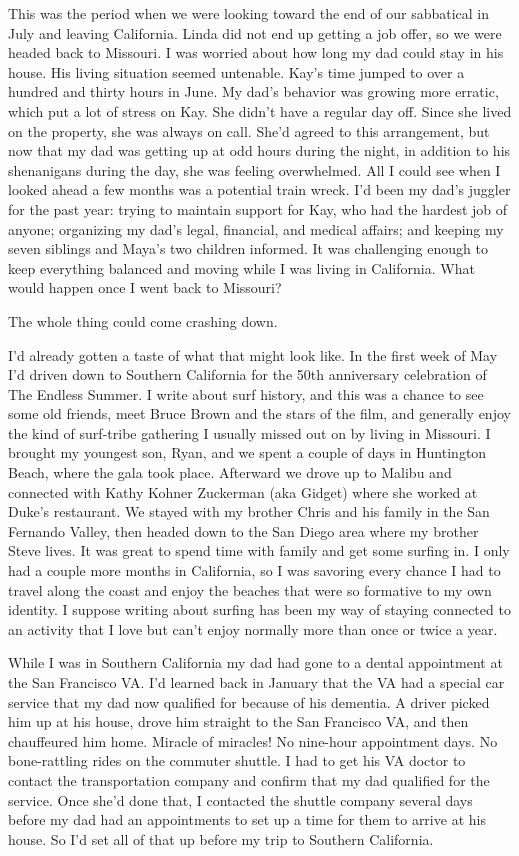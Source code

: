\documentclass[12pt]{book}
\begin{document}
This was the period when we were looking toward the end of our sabbatical in July and leaving California. Linda did not end up getting a job offer, so we were headed back to Missouri. I was worried about how long my dad could stay in his house. His living situation seemed untenable. Kay's time jumped to over a hundred and thirty hours in June. My dad's behavior was growing more erratic, which put a lot of stress on Kay. She didn't have a regular day off. Since she lived on the property, she was always on call. She'd agreed to this arrangement, but now that my dad was getting up at odd hours during the night, in addition to his shenanigans during the day, she was feeling overwhelmed. All I could see when I looked ahead a few months was a potential train wreck. I'd been my dad's juggler for the past year: trying to maintain support for Kay, who had the hardest job of anyone; organizing my dad's legal, financial, and medical affairs; and keeping my seven siblings and Maya's two children informed. It was challenging enough to keep everything balanced and moving while I was living in California. What would happen once I went back to Missouri?

The whole thing could come crashing down.

I'd already gotten a taste of what that might look like. In the first week of May I'd driven down to Southern California for the 50th anniversary celebration of The Endless Summer. I write about surf history, and this was a chance to see some old friends, meet Bruce Brown and the stars of the film, and generally enjoy the kind of surf-tribe gathering I usually missed out on by living in Missouri. I brought my youngest son, Ryan, and we spent a couple of days in Huntington Beach, where the gala took place. Afterward we drove up to Malibu and connected with Kathy Kohner Zuckerman (aka Gidget) where she worked at Duke's restaurant. We stayed with my brother Chris and his family in the San Fernando Valley, then headed down to the San Diego area where my brother Steve lives. It was great to spend time with family and get some surfing in. I only had a couple more months in California, so I was savoring every chance I had to travel along the coast and enjoy the beaches that were so formative to my own identity. I suppose writing about surfing has been my way of staying connected to an activity that I love but can't enjoy normally more than once or twice a year.

While I was in Southern California my dad had gone to a dental appointment at the San Francisco VA. I'd learned back in January that the VA had a special car service that my dad now qualified for because of his dementia. A driver picked him up at his house, drove him straight to the San Francisco VA, and then chauffeured him home. Miracle of miracles! No nine-hour appointment days. No bone-rattling rides on the commuter shuttle. I had to get his VA doctor to contact the transportation company and confirm that my dad qualified for the service. Once she'd done that, I contacted the shuttle company several days before my dad had an appointments to set up a time for them to arrive at his house. So I'd set all of that up before my trip to Southern California.
\end{document}
